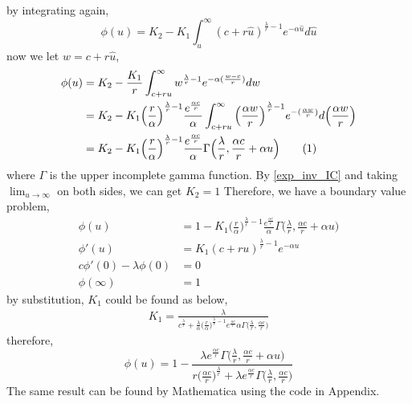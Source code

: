 \documentclass[12pt]{article}
\newcommand\numberthis{\addtocounter{equation}{1}\tag{\theequation}}
\begin{document}
by integrating again,
\begin{equation}
    \phi(u)=K_2-K_1\int^{\infty}_{u}(c+r\hat{u})^{\frac{\lambda}{r}-1}e^{-\alpha \hat{u}}d\hat{u}
\end{equation}
now we let \(w=c+r\hat{u}\),
\begin{align*}
    \phi(u)&=K_2-\frac{K_1}{r}\int^{\infty}_{c+ru}w^{\frac{\lambda}{r}-1}e^{-\alpha (\frac{w-c}{r})}dw\\
    &=K_2-K_1\Big(\frac{r}{\alpha}\Big)^{\frac{\lambda}{r}-1}\frac{e^{\frac{\alpha c}{r}}}{\alpha}\int^{\infty}_{c+ru}\Big(\frac{\alpha w}{r}\Big)^{\frac{\lambda}{r}-1}e^{- (\frac{\alpha w}{r})}d\Big(\frac{\alpha w}{r}\Big)\\
    &=K_2-K_1\Big(\frac{r}{\alpha}\Big)^{\frac{\lambda}{r}-1}\frac{e^{\frac{\alpha c}{r}}}{\alpha}\Gamma\Big(\frac{\lambda}{r},\frac{\alpha c}{r}+\alpha u\Big)\numberthis
\end{align*}
where \(\Gamma\) is the upper incomplete gamma function. By \eqref{exp_inv_IC} and taking $\displaystyle\lim_{u\to \infty}$ on both sides, we can get \(K_2=1\)
Therefore, we have a boundary value problem,
\begin{align}
    \phi(u)&=1-K_1\Big(\frac{r}{\alpha}\Big)^{\frac{\lambda}{r}-1}\frac{e^{\frac{\alpha c}{r}}}{\alpha}\Gamma\Big(\frac{\lambda}{r},\frac{\alpha c}{r}+\alpha u\Big)\\
    \phi'(u)&=K_1(c+ru)^{\frac{\lambda}{r}-1}e^{-\alpha u}\\
    c\phi'(0)-\lambda\phi(0)&=0\\
    \phi(\infty)&=1
\end{align}
by substitution, $K_1$ could be found as below,
\begin{align*}
    K_1=\frac{\lambda}{c^{\frac{\lambda}{r}}+\frac{\lambda}{\alpha}\big(\frac{r}{\alpha}\big)^{\frac{\lambda}{r}-1}e^{\frac{\alpha c}{r}}{\alpha}\Gamma\big(\frac{\lambda}{r},\frac{\alpha c}{r}\big)}
\end{align*}
therefore,
\begin{equation}\label{survival-f-exp-with-r}
    \phi(u)=1-\frac{\lambda e^{\frac{\alpha c}{r}}\Gamma\big(\frac{\lambda}{r},\frac{\alpha c}{r}+\alpha u\big)}{r\big(\frac{\alpha c}{r}\big)^{\frac{\lambda}{r}}+\lambda e^{\frac{\alpha c}{r}}\Gamma\big(\frac{\lambda}{r},\frac{\alpha c}{r}\big)}
\end{equation}
The same result can be found by Mathematica using the code in Appendix.

\end{document}
